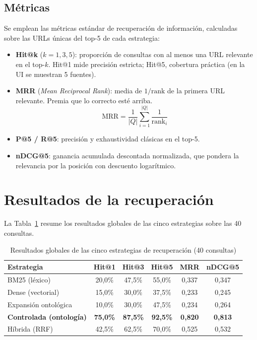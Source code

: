 \documentclass[12pt, a4paper, twoside]{report}
\begin{document}
\subsection{M\'etricas}

Se emplean las m\'etricas est\'andar de recuperaci\'on de informaci\'on, calculadas sobre las URLs \'unicas del top-5 de cada estrategia:

\begin{itemize}
  \item \textbf{Hit@k} ($k = 1, 3, 5$): proporci\'on de consultas con al menos una URL relevante en el top-$k$. Hit@1 mide precisi\'on estricta; Hit@5, cobertura pr\'actica (en la UI se muestran 5 fuentes).
  \item \textbf{MRR} (\textit{Mean Reciprocal Rank}): media de $1/\text{rank}$ de la primera URL relevante. Premia que lo correcto est\'e arriba.
  \begin{equation}
    \text{MRR} = \frac{1}{|Q|} \sum_{i=1}^{|Q|} \frac{1}{\text{rank}_i}
  \end{equation}
  \item \textbf{P@5 / R@5}: precisi\'on y exhaustividad cl\'asicas en el top-5.
  \item \textbf{nDCG@5}: ganancia acumulada descontada normalizada, que pondera la relevancia por la posici\'on con descuento logar\'itmico.
\end{itemize}

\section{Resultados de la recuperaci\'on}
\label{sec:resultados-retrieval}

La Tabla~\ref{tab:retrieval-metrics} resume los resultados globales de las cinco estrategias sobre las 40 consultas.

\begin{table}[H]
\centering
\caption{Resultados globales de las cinco estrategias de recuperaci\'on (40 consultas)}
\label{tab:retrieval-metrics}
\begin{tabular}{lccccc}
\toprule
\textbf{Estrategia} & \textbf{Hit@1} & \textbf{Hit@3} & \textbf{Hit@5} & \textbf{MRR} & \textbf{nDCG@5} \\
\midrule
BM25 (l\'exico)            & 20,0\% & 47,5\% & 55,0\% & 0,337 & 0,347 \\
Dense (vectorial)          & 15,0\% & 30,0\% & 37,5\% & 0,233 & 0,245 \\
Expansi\'on ontol\'ogica   & 10,0\% & 30,0\% & 47,5\% & 0,234 & 0,264 \\
\textbf{Controlada (ontolog\'ia)} & \textbf{75,0\%} & \textbf{87,5\%} & \textbf{92,5\%} & \textbf{0,820} & \textbf{0,813} \\
H\'ibrida (RRF)            & 42,5\% & 62,5\% & 70,0\% & 0,525 & 0,532 \\
\bottomrule
\end{tabular}
\end{table}
\end{document}
